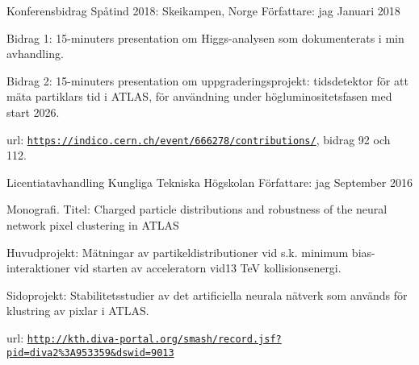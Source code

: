 \begin{cventries}
\cventry
{Konferensbidrag} %
{Sp{\aa}tind 2018: Skeikampen, Norge} %
{F{\"o}rfattare: jag} %
{Januari 2018} %
{ %
\begin{cvitems}
\item {Bidrag 1: 15-minuters presentation om Higgs-analysen som dokumenterats i min avhandling.}
\item {Bidrag 2: 15-minuters presentation om uppgraderingsprojekt: tidsdetektor f{\"o}r att m{\"a}ta partiklars tid i ATLAS, f{\"o}r anv{\"a}ndning under h{\"o}gluminositetsfasen med start 2026.}
\item url: \href{https://indico.cern.ch/event/666278/contributions/}{\texttt{https://indico.cern.ch/event/666278/contributions/}}, bidrag 92 och 112.
\end{cvitems}
}


\cventry
{Licentiatavhandling} %
{Kungliga Tekniska H{\"o}gskolan} %
{F{\"o}rfattare: jag} %
{September 2016} %
{ %
\begin{cvitems}
\item {Monografi. Titel: Charged particle distributions and robustness of the neural network pixel clustering in ATLAS}
\item {Huvudprojekt: M{\"a}tningar av partikeldistributioner vid s.k. minimum bias-interaktioner vid starten av acceleratorn vid13 TeV kollisionsenergi.}
\item {Sidoprojekt: Stabilitetsstudier av det artificiella neurala n{\"a}tverk som anv{\"a}nds f{\"o}r klustring av pixlar i ATLAS.}
\item url: \href{http://kth.diva-portal.org/smash/record.jsf?pid=diva2\%3A953359\&dswid=9013}{\texttt{http://kth.diva-portal.org/smash/record.jsf?pid=diva2\%3A953359\&dswid=9013}}
\end{cvitems}
}




\end{cventries}